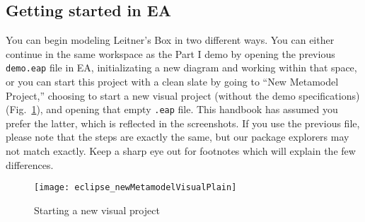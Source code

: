 \subsection{Getting started in EA}
\visHeader
\hypertarget{static:starting vis}{}

You can begin modeling Leitner's Box in two different ways. You can either continue in the same workspace as the Part I demo by opening the previous
\texttt{demo.eap} file in EA, initializating a new diagram and working within that space, or you can start this project with a clean slate by going to ``New
Metamodel Project,'' choosing to start a new visual project (without the demo specifications) (Fig.~\ref{fig:new_visModel}), and opening that empty
\texttt{.eap} file. This handbook has assumed you prefer the latter, which is reflected in the screenshots. If you use the previous file, please note that the
steps are exactly the same, but our package explorers may not match exactly. Keep a sharp eye out for footnotes which will explain the few differences.

\begin{figure}[htbp]
	\centering
  \texttt{[image: eclipse\_newMetamodelVisualPlain]}
	\caption{Starting a new visual project}
	\label{fig:new_visModel}
\end{figure}

